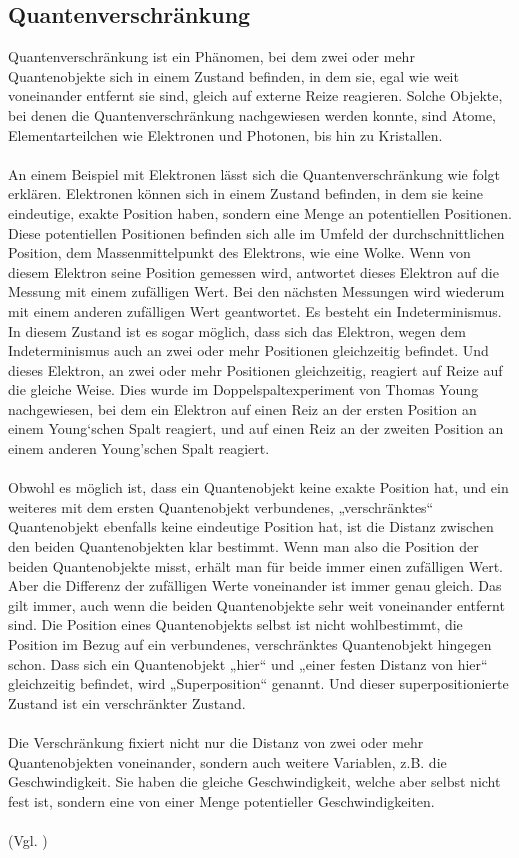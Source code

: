 \subsection{Quantenverschränkung}
Quantenverschränkung ist ein Phänomen, bei dem zwei oder mehr Quantenobjekte sich in einem Zustand befinden, in dem sie, egal wie weit voneinander entfernt sie sind, gleich auf externe Reize reagieren. Solche Objekte, bei denen die Quantenverschränkung nachgewiesen werden konnte, sind Atome, Elementarteilchen wie Elektronen und Photonen, bis hin zu Kristallen.\\
\\
An einem Beispiel mit Elektronen lässt sich die Quantenverschränkung wie folgt erklären. Elektronen können sich in einem Zustand befinden, in dem sie keine eindeutige, exakte Position haben, sondern eine Menge an potentiellen Positionen. Diese potentiellen Positionen befinden sich alle im Umfeld der durchschnittlichen Position, dem Massenmittelpunkt des Elektrons, wie eine Wolke. Wenn von diesem Elektron seine Position gemessen wird, antwortet dieses Elektron auf die Messung mit einem zufälligen Wert. Bei den nächsten Messungen wird wiederum mit einem anderen zufälligen Wert geantwortet. Es besteht ein Indeterminismus. In diesem Zustand ist es sogar möglich, dass sich das Elektron, wegen dem Indeterminismus auch an zwei oder mehr Positionen gleichzeitig befindet. Und dieses Elektron, an zwei oder mehr Positionen gleichzeitig, reagiert auf Reize auf die gleiche Weise. Dies wurde im Doppelspaltexperiment von Thomas Young nachgewiesen, bei dem ein Elektron auf einen Reiz an der ersten Position an einem Young‘schen Spalt reagiert, und auf einen Reiz an der zweiten Position an einem anderen Young’schen Spalt reagiert.\\
\\
Obwohl es möglich ist, dass ein Quantenobjekt keine exakte Position hat, und ein weiteres mit dem ersten Quantenobjekt verbundenes, „verschränktes“ Quantenobjekt ebenfalls keine eindeutige Position hat, ist die Distanz zwischen den beiden Quantenobjekten klar bestimmt. Wenn man also die Position der beiden Quantenobjekte misst, erhält man für beide immer einen zufälligen Wert. Aber die Differenz der zufälligen Werte voneinander ist immer genau gleich. Das gilt immer, auch wenn die beiden Quantenobjekte sehr weit voneinander entfernt sind. Die Position eines Quantenobjekts selbst ist nicht wohlbestimmt, die Position im Bezug auf ein verbundenes, verschränktes Quantenobjekt hingegen schon. Dass sich ein Quantenobjekt „hier“ und „einer festen Distanz von hier“ gleichzeitig befindet, wird „Superposition“ genannt. Und dieser superpositionierte Zustand ist ein verschränkter Zustand.\\
\\
Die Verschränkung fixiert nicht nur die Distanz von zwei oder mehr Quantenobjekten voneinander, sondern auch weitere Variablen, z.B. die Geschwindigkeit. Sie haben die gleiche Geschwindigkeit, welche aber selbst nicht fest ist, sondern eine von einer Menge potentieller Geschwindigkeiten.\\
\\
(Vgl. \cite[S.83-88]{gisin_unbegreifliche_2014}) 

